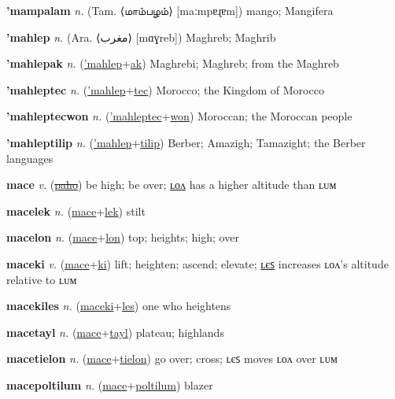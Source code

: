 \textbf{\hypertarget{'mampalam}{'mampalam}} \textit{n.} (Tam. ⟨{\tamil{}மாம்பழம்}⟩ [maːmpɐɻɐm])
mango; Mangifera

\textbf{\hypertarget{'mahlep}{'mahlep}} \textit{n.} (Ara. ⟨{\arabics{}مغرب‎}⟩ [mɑɣreb])
Maghreb; Maghrib

\textbf{\hypertarget{'mahlepak}{'mahlepak}} \textit{n.} (\hyperlink{'mahlep}{'mahlep}+\allowbreak \hyperlink{ak}{ak})
Maghrebi; Maghreb; from the Maghreb

\textbf{\hypertarget{'mahleptec}{'mahleptec}} \textit{n.} (\hyperlink{'mahlep}{'mahlep}+\allowbreak \hyperlink{tec}{tec})
Morocco; the Kingdom of Morocco

\textbf{\hypertarget{'mahleptecwon}{'mahleptecwon}} \textit{n.} (\hyperlink{'mahleptec}{'mahleptec}+\allowbreak \hyperlink{won}{won})
Moroccan; the Moroccan people

\textbf{\hypertarget{'mahleptilip}{'mahleptilip}} \textit{n.} (\hyperlink{'mahlep}{'mahlep}+\allowbreak \hyperlink{tilip}{tilip})
Berber; Amazigh; Tamazight; the Berber languages

\textbf{\hypertarget{mace}{mace}} \textit{v.} (\hyperlink{paho}{\sout{paho}})
be high; be over; \hyperlink{macelon}{ʟᴏᴧ} has a higher altitude than ʟᴜᴍ

\textbf{\hypertarget{macelek}{macelek}} \textit{n.} (\hyperlink{mace}{mace}+\allowbreak \hyperlink{lek}{lek})
stilt

\textbf{\hypertarget{macelon}{macelon}} \textit{n.} (\hyperlink{mace}{mace}+\allowbreak \hyperlink{lon}{lon})
top; heights; high; over

\textbf{\hypertarget{maceki}{maceki}} \textit{v.} (\hyperlink{mace}{mace}+\allowbreak \hyperlink{ki}{ki})
lift; heighten; ascend; elevate; \hyperlink{macekiles}{ʟєꜱ} increases ʟᴏᴧ’s altitude relative to ʟᴜᴍ

\textbf{\hypertarget{macekiles}{macekiles}} \textit{n.} (\hyperlink{maceki}{maceki}+\allowbreak \hyperlink{les}{les})
one who heightens

\textbf{\hypertarget{macetayl}{macetayl}} \textit{n.} (\hyperlink{mace}{mace}+\allowbreak \hyperlink{tayl}{tayl})
plateau; highlands

\textbf{\hypertarget{macetielon}{macetielon}} \textit{n.} (\hyperlink{mace}{mace}+\allowbreak \hyperlink{tielon}{tielon})
go over; cross; ʟєꜱ moves ʟᴏᴧ over ʟᴜᴍ

\textbf{\hypertarget{macepoltilum}{macepoltilum}} \textit{n.} (\hyperlink{mace}{mace}+\allowbreak \hyperlink{poltilum}{poltilum})
blazer

